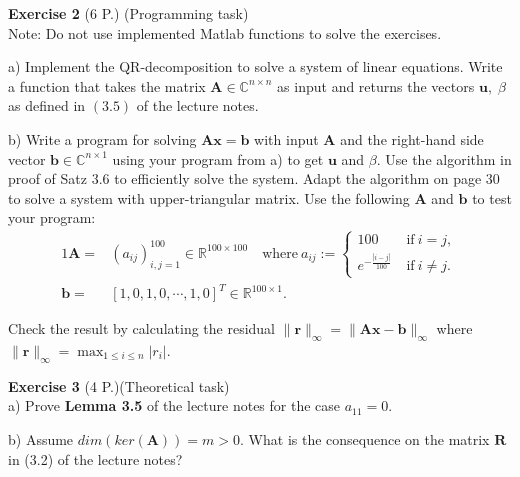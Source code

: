 \documentclass[11pt,a4paper,DIV9,german]{scrartcl}
\theoremstyle{break}   %
\begin{document}
\vspace{0.6cm}

\textbf{Exercise 2} (6 P.) (Programming task)\\
Note: Do not use implemented Matlab functions to solve the exercises. 

a) Implement the QR-decomposition to solve a system of linear equations.  Write a function that takes the matrix \(\mathbf{A}\in\mathds{C}^{n\times n}\) as input  and returns the vectors \(\mathbf{u}, \; \beta\) as defined in \((3.5)\) of the lecture notes.


b) Write a program for solving $\mathbf{Ax}=\mathbf{b}$ with input $\mathbf{A}$ and the right-hand side vector \(\mathbf{b}\in\mathds{C}^{n\times 1}\) using your program from a) to get $\mathbf{u}$ and $\beta$. Use the algorithm in proof of Satz $3.6$ to efficiently solve the system. Adapt the algorithm on page $30$ to solve a system with upper-triangular matrix.  Use the following \(\mathbf{A}\) and \(\mathbf{b}\) to test your program: 
\begin{alignat*}{1}
  \mathbf{A}=&(a_{ij})_{i,j=1}^{100}\in\mathds{R}^{100\times 100}\quad\mathrm{where}~
  a_{ij}:=
  \begin{cases}
    100          ~&\mathrm{if}~i=j,\\
    e^{-\frac{|i-j|}{100}}~&\mathrm{if}~i\neq j.
  \end{cases}\\
  \mathbf{b}=&[1,0,1,0,\cdots,1,0]^T\in\mathds{R}^{100\times 1}.
\end{alignat*}

Check the result by calculating the residual \(\|\mathbf{r}\|_{\infty}=\|\mathbf{Ax}-\mathbf{b}\|_{\infty}\) where \(\displaystyle \|\mathbf{r}\|_{\infty}=\max_{1\leq i \leq n}|r_i|\).

\textbf{Exercise 3} (4 P.)(Theoretical task)\\
a) Prove \textbf{Lemma 3.5} of the lecture notes for the case $a_{11} = 0$.

b) Assume $dim(ker(\mathbf{A}))=m> 0.$ What is the consequence on the matrix $\mathbf{R}$ in (3.2) of the lecture notes?
\end{document}
